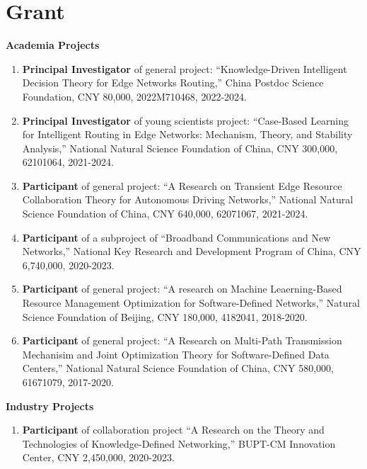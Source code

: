 \documentclass[letterpaper,11pt]{article}
\newcommand{\contentlength}{5.5in}
\begin{document}
	\section{\textbf{Grant}}
	\begin{tcolorbox}[flush right,breakable,colback=white,colframe=white,width=\contentlength]
		\textbf{Academia Projects}
		\begin{enumerate}
			\item \textbf{Principal Investigator} of general project: “Knowledge-Driven Intelligent Decision Theory for Edge Networks Routing,” China Postdoc Science Foundation, CNY 80,000, 2022M710468, 2022-2024.
			\item \textbf{Principal Investigator} of young scientists project: “Case-Based Learning for Intelligent Routing in Edge Networks: Mechanism, Theory, and Stability Analysis,” National Natural Science Foundation of China, CNY 300,000, 62101064, 2021-2024.
			\item \textbf{Participant} of general project: “A Research on Transient Edge Resource Collaboration Theory for Autonomous Driving Networks,” National Natural Science Foundation of China, CNY 640,000, 62071067, 2021-2024.
			\item \textbf{Participant} of a subproject of “Broadband Communications and New Networks,” National Key Research and Development Program of China, CNY 6,740,000, 2020-2023.
			\item \textbf{Participant} of general project: “A research on Machine Leaerning-Based Resource Management Optimization for Software-Defined Networks,” Natural Science Foundation of Beijing, CNY 180,000, 4182041, 2018-2020.
			\item \textbf{Participant} of general project: “A Research on Multi-Path Transmission Mechanisim and Joint Optimization Theory for Software-Defined Data Centers,” National Natural Science Foundation of China, CNY 580,000, 61671079, 2017-2020.
		\end{enumerate}
		\textbf{Industry Projects}
		\begin{enumerate}
			\item \textbf{Participant} of collaboration project “A Research on the Theory and Technologies of Knowledge-Defined Networking,” BUPT-CM Innovation Center, CNY 2,450,000, 2020-2023.
		\end{enumerate}
	\end{tcolorbox}
	
\end{document}
